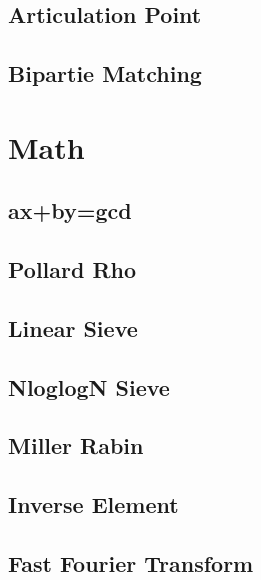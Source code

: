 \documentclass[a4paper,10pt,twocolumn,oneside]{article}
\begin{document}
\subsection{Articulation Point}


\subsection{Bipartie Matching}


\section{Math}
\subsection{ax+by=gcd}


\subsection{Pollard Rho}


\subsection{Linear Sieve}


\subsection{NloglogN Sieve}


\subsection{Miller Rabin}


\subsection{Inverse Element}


\subsection{Fast Fourier Transform}

\end{document}
